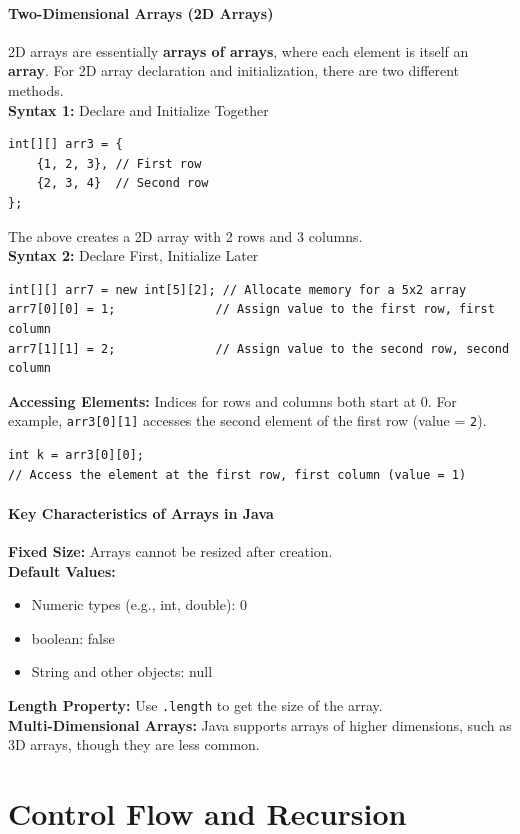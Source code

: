 \documentclass[letterpaper,12pt]{article}
\begin{document}
\subsection{Two-Dimensional Arrays (2D Arrays)}
2D arrays are essentially \textbf{arrays of arrays}, where each element is itself an \textbf{array}. For 2D array declaration and initialization, there are two different methods.\\
\textbf{Syntax 1:} Declare and Initialize Together
\begin{verbatim}
int[][] arr3 = {
    {1, 2, 3}, // First row
    {2, 3, 4}  // Second row
};
\end{verbatim}
The above creates a 2D array with 2 rows and 3 columns.\\
\textbf{Syntax 2:} Declare First, Initialize Later
\begin{verbatim}
int[][] arr7 = new int[5][2]; // Allocate memory for a 5x2 array
arr7[0][0] = 1;              // Assign value to the first row, first column
arr7[1][1] = 2;              // Assign value to the second row, second column
\end{verbatim}
\textbf{Accessing Elements:} Indices for rows and columns both start at 0. For example, \texttt{arr3[0][1]} accesses the second element of the first row (value = \texttt{2}).
\begin{verbatim}
int k = arr3[0][0];
// Access the element at the first row, first column (value = 1)
\end{verbatim}

\subsection{Key Characteristics of Arrays in Java}
\textbf{Fixed Size:} Arrays cannot be resized after creation.\\
\textbf{Default Values:}
\begin{itemize}
    \item Numeric types (e.g., int, double): 0
    \item boolean: false
    \item String and other objects: null
\end{itemize}
\textbf{Length Property:} Use \texttt{.length} to get the size of the array.\\
\textbf{Multi-Dimensional Arrays:} Java supports arrays of higher dimensions, such as 3D arrays, though they are less common.

\part{Control Flow and Recursion}
\end{document}
